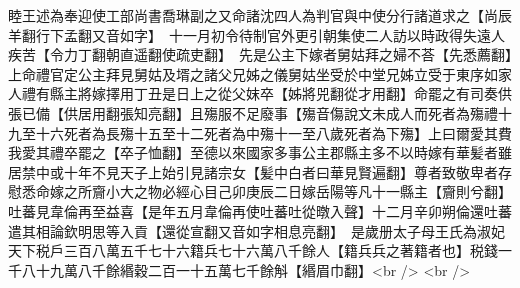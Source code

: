 睦王述為奉迎使工部尚書喬琳副之又命諸沈四人為判官與中使分行諸道求之【尚辰羊翻行下孟翻又音如字】　十一月初令待制官外更引朝集使二人訪以時政得失遠人疾苦【令力丁翻朝直遥翻使疏吏翻】　先是公主下嫁者舅姑拜之婦不荅【先悉薦翻】上命禮官定公主拜見舅姑及壻之諸父兄姊之儀舅姑坐受於中堂兄姊立受于東序如家人禮有縣主將嫁擇用丁丑是日上之從父妺卒【姊將兕翻從才用翻】命罷之有司奏供張已備【供居用翻張知亮翻】且殤服不足廢事【殤音傷說文未成人而死者為殤禮十九至十六死者為長殤十五至十二死者為中殤十一至八歲死者為下殤】上曰爾愛其費我愛其禮卒罷之【卒子恤翻】至德以來國家多事公主郡縣主多不以時嫁有華髪者雖居禁中或十年不見天子上始引見諸宗女【髪中白者曰華見賢遍翻】尊者致敬卑者存慰悉命嫁之所齎小大之物必經心目己卯庚辰二日嫁岳陽等凡十一縣主【齎則兮翻】　吐蕃見韋倫再至益喜【是年五月韋倫再使吐蕃吐從暾入聲】十二月辛卯朔倫還吐蕃遣其相論欽明思等入貢【還從宣翻又音如字相息亮翻】　是歲册太子母王氏為淑妃　天下税戶三百八萬五千七十六籍兵七十六萬八千餘人【籍兵兵之著籍者也】税錢一千八十九萬八千餘緡穀二百一十五萬七千餘斛【緡眉巾翻】<br />
<br />
